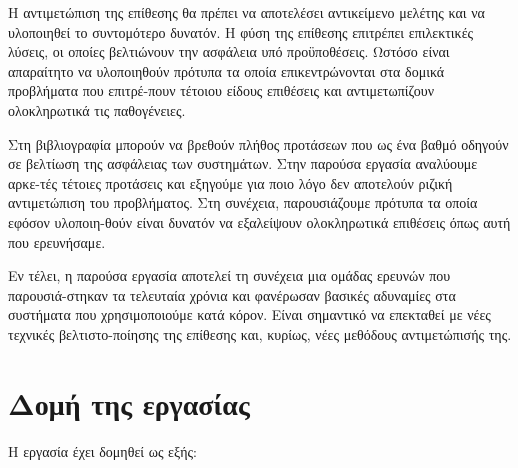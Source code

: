 Η αντιμετώπιση της επίθεσης θα πρέπει να αποτελέσει αντικείμενο μελέτης και να
υλοποιηθεί το συντομότερο δυνατόν. Η φύση της επίθεσης επιτρέπει επιλεκτικές
λύσεις, οι οποίες βελτιώνουν την ασφάλεια υπό προϋποθέσεις. Ωστόσο είναι
απαραίτητο να υλοποιηθούν πρότυπα τα οποία επικεντρώνονται στα δομικά προβλήματα
που επιτρέ-πουν τέτοιου είδους επιθέσεις και αντιμετωπίζουν ολοκληρωτικά τις
παθογένειες.

Στη βιβλιογραφία μπορούν να βρεθούν πλήθος προτάσεων που ως ένα βαθμό οδηγούν
σε βελτίωση της ασφάλειας των συστημάτων. Στην παρούσα εργασία αναλύουμε αρκε-τές
τέτοιες προτάσεις και εξηγούμε για ποιο λόγο δεν αποτελούν ριζική αντιμετώπιση
του προβλήματος. Στη συνέχεια, παρουσιάζουμε πρότυπα τα οποία εφόσον
υλοποιη-θούν είναι δυνατόν να εξαλείψουν ολοκληρωτικά επιθέσεις όπως αυτή που
ερευνήσαμε.

Εν τέλει, η παρούσα εργασία αποτελεί τη συνέχεια μια ομάδας ερευνών που
παρουσιά-στηκαν τα τελευταία χρόνια και φανέρωσαν βασικές αδυναμίες στα
συστήματα που χρησιμοποιούμε κατά κόρον. Είναι σημαντικό να επεκταθεί με νέες
τεχνικές βελτιστο-ποίησης της επίθεσης και, κυρίως, νέες μεθόδους αντιμετώπισής
της.

\section{Δομή της εργασίας}\label{sec:structure}

Η εργασία έχει δομηθεί ως εξής:

